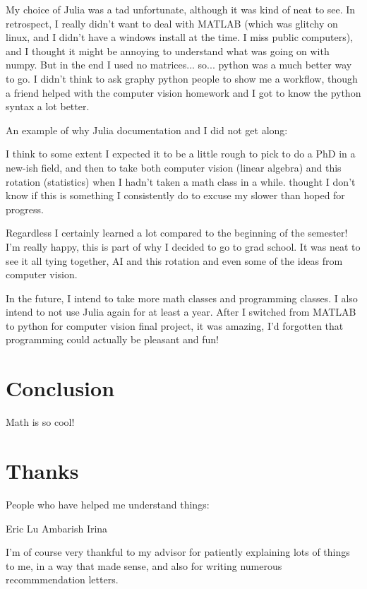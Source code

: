 \documentclass[a4paper]{article}
\begin{document}
My choice of Julia was a tad unfortunate, although it was kind of neat to see.
In retrospect, I really didn't want to deal with MATLAB (which was glitchy on
linux, and I didn't have a windows install at the time. I miss public
computers), and I thought it might be annoying to understand what was going on
with numpy. But in the end I used no matrices... so... python was a much better
way to go. I didn't think to ask graphy python people to show me a workflow,
though a friend helped with the computer vision homework and I got to know the
python syntax a lot better.

An example of why Julia documentation and I did not get along:

I think to some extent I expected it to be a little rough to pick to do a PhD in a new-ish
field, and then to take both computer vision (linear algebra) and this rotation
(statistics) when I hadn't taken a math class in a while. thought I don't know if this
is something I consistently do to excuse my slower than hoped for progress.

Regardless I certainly learned a lot compared to the beginning of the semester!
I'm really happy, this is part of why I decided to go to grad school. It was
neat to see it all tying together, AI and this rotation and even some of the
ideas from computer vision.

In the future, I intend to take more math classes and programming classes. I
also intend to not use Julia again for at least a year. After I switched from
MATLAB to python for computer vision final project, it was amazing, I'd
forgotten that programming could actually be pleasant and fun!

\section{Conclusion}

Math is so cool!

\section{Thanks}

People who have helped me understand things:

Eric Lu
Ambarish
Irina

I'm of course very thankful to my advisor for patiently explaining lots of
things to me, in a way that made sense, and also for writing numerous
recommmendation letters.
\end{document}
